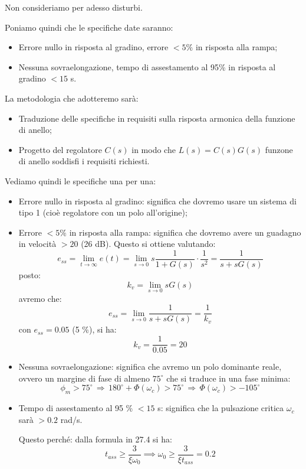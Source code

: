 \documentclass[a4paper,11pt]{article}
\begin{document}
Non consideriamo per adesso disturbi.

Poniamo quindi che le specifiche date saranno:
\begin{itemize}
	\item Errore nullo in risposta al gradino, errore $< 5\%$ in risposta alla rampa;
	\item Nessuna sovraelongazione, tempo di assestamento al 95\% in risposta al gradino $< 15$ s.
\end{itemize}

La metodologia che adotteremo sarà:
\begin{itemize}
	\item Traduzione delle specifiche in requisiti sulla risposta armonica della funzione di anello;
	\item Progetto del regolatore $C(s)$ in modo che $L(s) = C(s)G(s)$ funzone di anello soddisfi i requisiti richiesti.
\end{itemize}

Vediamo quindi le specifiche una per una:
\begin{itemize}
	\item Errore nullo in risposta al gradino: significa che dovremo usare un sistema di tipo 1 (cioè regolatore con un polo all'origine);
	\item Errore $< 5\%$ in risposta alla rampa: significa che dovremo avere un guadagno in velocità $> 20$ (26 dB).
		Questo si ottiene valutando:
		$$
		e_{ss} = \lim_{t \rightarrow \infty} e(t) = \lim_{s \rightarrow 0} s \frac{1}{1 + G(s)} \cdot \frac{1}{s^2} = \frac{1}{s + s G(s)}
		$$
		posto:
		$$
		k_v = \lim_{s \rightarrow 0} s G(s)
		$$
		avremo che:
		$$
		e_{ss} = \lim_{s \rightarrow 0} \frac{1}{s + s G(s)} = \frac{1}{k_v}
		$$
		con $e_{ss} = 0.05$ (5 \%), si ha:
		$$
		k_v = \frac{1}{0.05} = 20
		$$
	\item Nessuna sovraelongazione: significa che avremo un polo dominante reale, ovvero un margine di fase di almeno $75^\circ$ che si traduce in una fase minima:
		$$
		\phi_m > 75^\circ \, \Rightarrow \, 180^\circ + \Phi(\omega_c) > 75^\circ \, \Rightarrow \, \Phi(\omega_c) > -105^\circ
		$$
	\item Tempo di assestamento al 95 \% $< 15$ s: significa che la pulsazione critica $\omega_c$ sarà $> 0.2$ rad/s.

		Questo perché: dalla formula in 27.4 si ha:
		$$
		t_{ass} \geq \frac{3}{\xi \omega_0} \implies \omega_0 \geq \frac{3}{\xi t_{ass}} = 0.2
		$$
\end{itemize}
\end{document}
